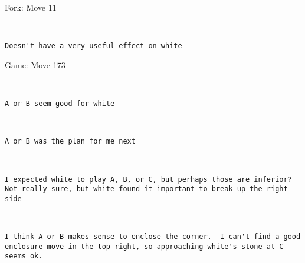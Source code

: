 \documentclass{article}
\begin{document}
\begin{subsection}{Fork: Move 11}
\begin{center}
\cleargoban
{}
\showfullgoban
\\\begin{lstlisting}
Doesn't have a very useful effect on white\end{lstlisting}
\end{center}
\end{subsection}
\newpage
\begin{section}{Game: Move 173}
\begin{center}
\cleargoban
{}
\showfullgoban
\\\begin{lstlisting}
A or B seem good for white\end{lstlisting}
\end{center}
\begin{center}
\cleargoban
{}
\showfullgoban
\\\begin{lstlisting}
A or B was the plan for me next\end{lstlisting}
\end{center}
\begin{center}
\cleargoban
{}
\showfullgoban
\\\begin{lstlisting}
I expected white to play A, B, or C, but perhaps those are inferior?  Not really sure, but white found it important to break up the right side\end{lstlisting}
\end{center}
\begin{center}
\cleargoban
{}
\showfullgoban
\\\begin{lstlisting}
I think A or B makes sense to enclose the corner.  I can't find a good enclosure move in the top right, so approaching white's stone at C seems ok.


\end{lstlisting}
\end{center}
\end{section}
\end{document}
